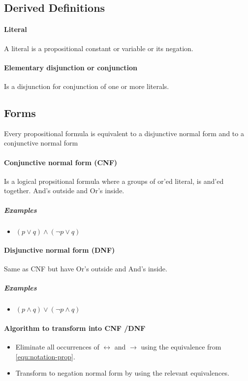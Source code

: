 \subsection{Derived Definitions}

\paragraph{Literal}
A literal is a propositional constant or variable or its negation. 


\paragraph{Elementary disjunction or conjunction}
Is a disjunction for conjunction of one or more literals.


\subsection{Forms}

Every propositional formula is equivalent to a disjunctive normal form and to a conjunctive normal form

\paragraph{Conjunctive normal form (CNF)}

Is a logical propsitional formula where a groups of or'ed literal, is and'ed together. And's outside and Or's inside.

\subparagraph{Examples}

\begin{itemize}
\item $(p \lor q) \land (\neg p \lor q)$
\end{itemize}

\paragraph{Disjunctive normal form (DNF)}

Same as CNF but have Or's outside and And's inside.

\subparagraph{Examples}

\begin{itemize}
\item $(p \land q) \lor (\neg p \land q)$
\end{itemize}

\paragraph{Algorithm to transform into CNF /DNF}

\begin{itemize}
\item Eliminate all occurrences of $\leftrightarrow$ and $\to$ using the equivalence  from \ref{equ:notation-prop}.
\item Transform to negation normal form by using the relevant equivalences. 
\end{itemize}


